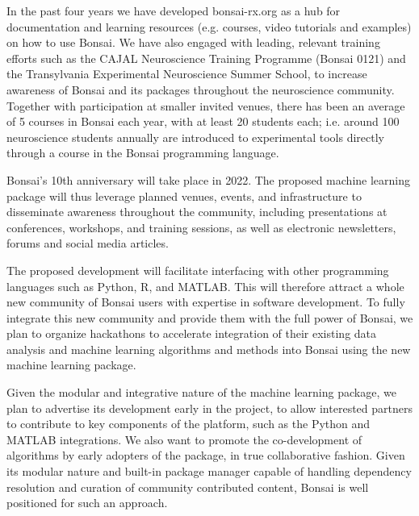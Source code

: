 In the past four years we have developed bonsai-rx.org as a hub for documentation and learning
resources (e.g. courses, video tutorials and examples) on how to use Bonsai. We have also engaged
with leading, relevant training efforts such as the CAJAL Neuroscience
Training Programme (Bonsai 0121) and the Transylvania Experimental Neuroscience
Summer School, to increase awareness of Bonsai and
its packages throughout the neuroscience community. Together with participation
at smaller invited venues, there has been an average of 5 courses in Bonsai
each year, with at least 20 students each; i.e.  around 100 neuroscience students annually are introduced to experimental tools directly through a
course in the Bonsai programming language.

Bonsai's 10th anniversary will take place in 2022. The proposed machine learning package will thus leverage planned venues, events, and infrastructure to disseminate
awareness throughout the community, including presentations at conferences,
workshops, and training sessions, as well as electronic newsletters, forums and
social media articles.

The proposed development will facilitate interfacing with other programming languages
such as Python, R, and MATLAB. This will therefore attract a whole new
community of Bonsai users with expertise in software development. To fully integrate this new community and provide them with the full power of Bonsai,
we plan to organize hackathons to accelerate integration of their existing data
analysis and machine learning algorithms and methods into Bonsai using the new
machine learning package.

 Given the modular and integrative nature of the machine learning package, we
 plan to advertise its development early in the project, to allow interested
 partners to contribute to key
 components of the platform, such as the Python and MATLAB integrations. We
 also want to promote the co-development of algorithms by early adopters of the
 package, in true collaborative fashion. Given its modular nature and built-in
 package manager capable of handling dependency resolution and curation of
 community contributed content, Bonsai is well positioned for such an approach.

